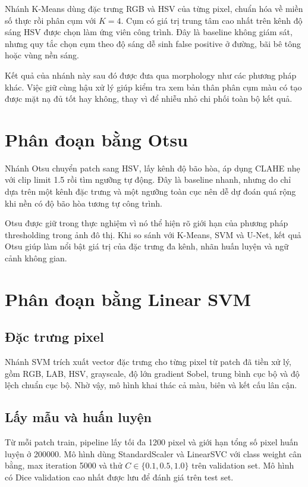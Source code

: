\documentclass[12pt,a4paper]{report}
\begin{document}
Nhánh K-Means dùng đặc trưng RGB và HSV của từng pixel, chuẩn hóa về miền số thực rồi phân cụm với $K=4$. Cụm có giá trị trung tâm cao nhất trên kênh độ sáng HSV được chọn làm ứng viên công trình. Đây là baseline không giám sát, nhưng quy tắc chọn cụm theo độ sáng dễ sinh false positive ở đường, bãi bê tông hoặc vùng nền sáng.

Kết quả của nhánh này sau đó được đưa qua morphology như các phương pháp khác. Việc giữ cùng hậu xử lý giúp kiểm tra xem bản thân phân cụm màu có tạo được mặt nạ đủ tốt hay không, thay vì để nhiễu nhỏ chi phối toàn bộ kết quả.

\section{Phân đoạn bằng Otsu}

Nhánh Otsu chuyển patch sang HSV, lấy kênh độ bão hòa, áp dụng CLAHE nhẹ với clip limit 1.5 rồi tìm ngưỡng tự động. Đây là baseline nhanh, nhưng do chỉ dựa trên một kênh đặc trưng và một ngưỡng toàn cục nên dễ dự đoán quá rộng khi nền có độ bão hòa tương tự công trình.

Otsu được giữ trong thực nghiệm vì nó thể hiện rõ giới hạn của phương pháp thresholding trong ảnh đô thị. Khi so sánh với K-Means, SVM và U-Net, kết quả Otsu giúp làm nổi bật giá trị của đặc trưng đa kênh, nhãn huấn luyện và ngữ cảnh không gian.

\section{Phân đoạn bằng Linear SVM}

\subsection{Đặc trưng pixel}

Nhánh SVM trích xuất vector đặc trưng cho từng pixel từ patch đã tiền xử lý, gồm RGB, LAB, HSV, grayscale, độ lớn gradient Sobel, trung bình cục bộ và độ lệch chuẩn cục bộ. Nhờ vậy, mô hình khai thác cả màu, biên và kết cấu lân cận.

\subsection{Lấy mẫu và huấn luyện}

Từ mỗi patch train, pipeline lấy tối đa 1200 pixel và giới hạn tổng số pixel huấn luyện ở 200000. Mô hình dùng StandardScaler và LinearSVC với class weight cân bằng, max iteration 5000 và thử $C \in \{0.1,0.5,1.0\}$ trên validation set. Mô hình có Dice validation cao nhất được lưu để đánh giá trên test set.
\end{document}
